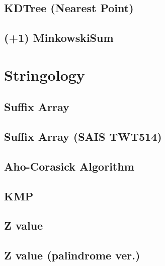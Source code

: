 \documentclass[10pt,twocolumn,oneside]{article}
\begin{document}
\subsection{KDTree (Nearest Point)}


\subsection{(+1) MinkowskiSum}


\newpage

\section{Stringology}
\subsection{Suffix Array}


\newpage

\subsection{Suffix Array (SAIS TWT514)}


\newpage

\subsection{Aho-Corasick Algorithm}


\subsection{KMP}


\subsection{Z value}


\subsection{Z value (palindrome ver.)}

\end{document}

